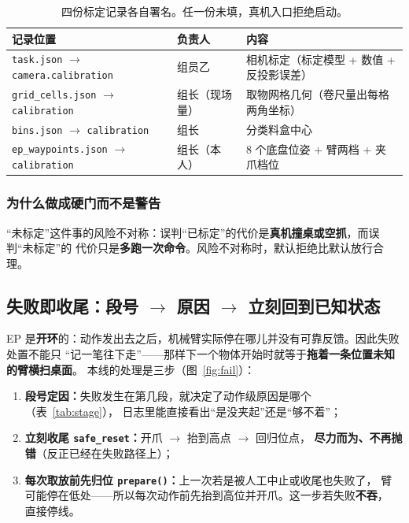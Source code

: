 \documentclass[12pt,a4paper]{ctexart}
\begin{document}
\begin{table}[htbp]
  \centering
  \small
  \begin{tabular}{@{}l l p{6.4cm}@{}}
    \toprule
    记录位置 & 负责人 & 内容 \\
    \midrule
    \texttt{task.json} $\to$ \texttt{camera.calibration} & 组员乙 & 相机标定（标定模型 + 数值 + 反投影误差） \\
    \texttt{grid\_cells.json} $\to$ \texttt{calibration} & 组长（现场量） & 取物网格几何（卷尺量出每格两角坐标） \\
    \texttt{bins.json} $\to$ \texttt{calibration} & 组长 & 分类料盒中心 \\
    \texttt{ep\_waypoints.json} $\to$ \texttt{calibration} & 组长（本人） & 8 个底盘位姿 + 臂两档 + 夹爪档位 \\
    \bottomrule
  \end{tabular}
  \caption{四份标定记录各自署名。任一份未填，真机入口拒绝启动。}
  \label{tab:calib}
\end{table}

\subsubsection*{为什么做成硬门而不是警告}

“未标定”这件事的风险不对称：误判“已标定”的代价是\textbf{真机撞桌或空抓}，而误判“未标定”的
代价只是\textbf{多跑一次命令}。风险不对称时，默认拒绝比默认放行合理。

\subsection{失败即收尾：段号 \texorpdfstring{$\to$}{->} 原因 \texorpdfstring{$\to$}{->} 立刻回到已知状态}

EP 是\textbf{开环}的：动作发出去之后，机械臂实际停在哪儿并没有可靠反馈。因此失败处置不能只
“记一笔往下走”——那样下一个物体开始时就等于\textbf{拖着一条位置未知的臂横扫桌面}。
本线的处理是三步（图~\ref{fig:fail}）：

\begin{enumerate}[leftmargin=1.8em]
  \item \textbf{段号定因：}失败发生在第几段，就决定了动作级原因是哪个（表~\ref{tab:stage}），
        日志里能直接看出“是没夹起”还是“够不着”；
  \item \textbf{立刻收尾 \texttt{safe\_reset}：}开爪 $\to$ 抬到高点 $\to$ 回归位点，
        \textbf{尽力而为、不再抛错}（反正已经在失败路径上）；
  \item \textbf{每次取放前先归位 \texttt{prepare()}：}上一次若是被人工中止或收尾也失败了，
        臂可能停在低处——所以每次动作前先抬到高位并开爪。这一步若失败\textbf{不吞}，
        直接停线。
\end{enumerate}
\end{document}
